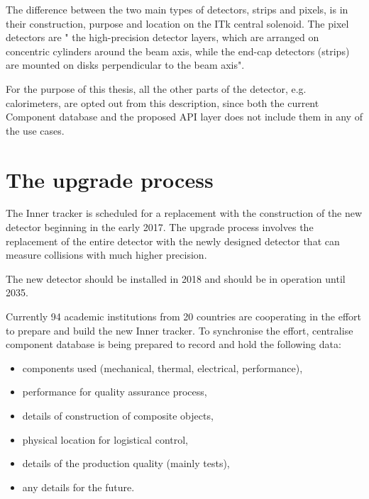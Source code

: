 \par The difference between the two main types of detectors, strips and pixels, is in their construction, purpose and location on the ITk central solenoid. The pixel detectors are " the high-precision detector layers, which are arranged on concentric cylinders around the beam axis, while the end-cap detectors (strips) are mounted on disks perpendicular to the beam axis".  \cite[page 14]{atlasExperiment}

\par For the purpose of this thesis, all the other parts of the detector, e.g. calorimeters, are opted out from this description, since both the current Component database and the proposed API layer does not include them in any of the use cases.

\section{The upgrade process}
\par The Inner tracker is scheduled for a replacement with the construction of the new detector beginning in the early 2017. The upgrade process involves the replacement of the entire detector with the newly designed detector that can measure collisions with much higher precision.

\par The new detector should be installed in 2018 and should be in operation until 2035. \cite{sverma}

\par Currently 94 academic institutions from 20 countries are cooperating in the effort to prepare and build the new Inner tracker. To synchronise the effort, centralise component database is being prepared to record and hold the following data: \cite[slide 4]{databasePresentation}

\begin{itemize}
	\item components used (mechanical, thermal, electrical, performance),
	\item performance for quality assurance process,
	\item details of construction of composite objects,
	\item physical location for logistical control,
	\item details of the production quality (mainly tests),
	\item any details for the future.
\end{itemize}

